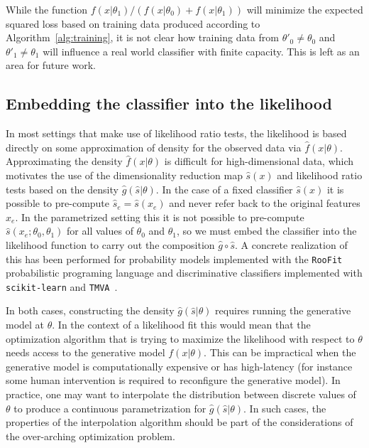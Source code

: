 \documentclass[11pt, oneside]{article}   	%
\begin{document}
While the function $f(x|\theta_1)/(f(x|\theta_0)+f(x|\theta_1))$ will minimize the expected squared loss based on 
training data produced according to Algorithm~\ref{alg:training}, it is not clear how training data from $\theta'_0 \ne \theta_0$ and $\theta'_1 \ne \theta_1$ will influence a real world classifier with finite capacity. This is left as an area for future work.

\subsection{Embedding the classifier into the likelihood}

In most settings that make use of likelihood ratio tests, the likelihood is based directly on some approximation of density for the observed data via $\hat{f}(x|\theta)$.  Approximating the density $\hat{f}(x|\theta)$ is difficult for high-dimensional data, which motivates the use of the dimensionality reduction map $\hat{s}(x)$ and likelihood ratio tests based on the density $\hat{g}(\hat{s}|\theta)$.  In the case of a fixed classifier $\hat s(x)$ it is possible to pre-compute $\hat s_e=\hat s(x_e)$ and never refer back to the original features $x_e$. In the parametrized setting this it is not possible to pre-compute $\hat s(x_e; \theta_0, \theta_1)$ for all values of $\theta_0$ and $\theta_1$, so  we must embed the classifier into the likelihood function to carry out the composition $\hat{g}\circ \hat{s}$. A concrete realization of this has been performed for probability models implemented with the \texttt{RooFit} probabilistic programing language and discriminative classifiers implemented with \texttt{scikit-learn} and \texttt{TMVA}~\citep{Verkerke:2003ir,scikit-learn,Hocker:2007ht}.

In both cases, constructing the density $\hat g(\hat s|\theta)$ requires running the generative model at $\theta$. In the context of a likelihood fit this would mean that the optimization algorithm that is trying to maximize the likelihood with respect to $\theta$ needs access to the generative model $f(x|\theta)$. This can be  impractical when the generative model is computationally expensive or has high-latency (for instance some human intervention is required to reconfigure the generative model).  In practice, one may want to interpolate the distribution between discrete values of $\theta$ to produce a continuous parametrization for $\hat g(\hat s | \theta)$. In such cases, the properties of the interpolation algorithm should be part of the considerations of the over-arching optimization problem.
\end{document}
